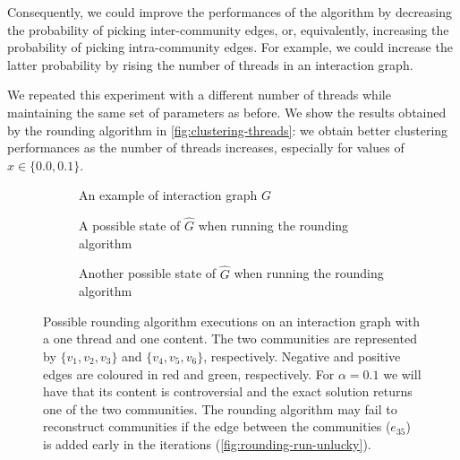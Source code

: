 
Consequently, we could improve the performances of the algorithm by decreasing the probability
of picking inter-community edges, or, equivalently, increasing the probability
of picking intra-community edges. For example, we could increase the latter probability
by rising the number of threads in an interaction graph.

We repeated this experiment with a different number of threads
while maintaining the same set of parameters as before. We show the results
obtained by the rounding algorithm in \autoref{fig:clustering-threads}: we obtain better clustering
performances as the number of threads increases, especially for values of
$x \in \{ 0.0, 0.1 \}$.

\begin{figure}
	\begin{center}
		\begin{subfigure}{0.3\textwidth}
			\centering
			\caption{An example of interaction graph $G$}
			\label{fig:rounding-interaction-graph-example}
		\end{subfigure}
		\quad
		\begin{subfigure}{0.3\textwidth}
			\centering
			\caption{A possible state of $\hat{G}$ when running the rounding
				algorithm}
			\label{fig:rounding-run-unlucky}
		\end{subfigure}
		\quad
		\begin{subfigure}{0.3\textwidth}
			\centering
			\caption{Another possible state of $\hat{G}$ when running the
				rounding algorithm}
			\label{fig:rounding-run-lucky}
		\end{subfigure}
	\end{center}
	\caption[An interaction graph with a single thread and content and two
		possible iterations of the rounding algorithm]{Possible rounding algorithm
		executions on an interaction graph with a
		one thread and one content. The two communities are represented by $\{ v_1, v_2,
			v_3\}$ and $\{ v_4, v_5, v_6\}$, respectively. Negative and
		positive edges are coloured in red and green, respectively.
		For $\alpha = 0.1$ we will have that its content is
		controversial and the exact solution returns one of
		the two communities. The rounding algorithm may fail to reconstruct
		communities if the edge between the communities ($e_{35}$) is added early in
		the iterations (\autoref{fig:rounding-run-unlucky}).}
	\label{fig:rounding-example}
\end{figure}

